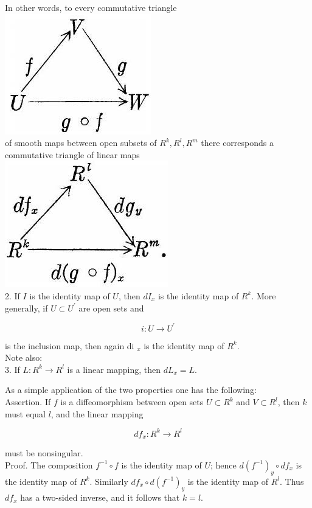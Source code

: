 \documentclass[10pt, letterpaper]{article}
\begin{document}
In other words, to every commutative triangle\\
\includegraphics[scale=0.2, center]{2025_05_28_7c9927389b272ddbc2c3g-14(1)}\\
of smooth maps between open subsets of $R^{k}, R^{l}, R^{m}$ there corresponds a commutative triangle of linear maps\\
\includegraphics[scale=0.2, center]{2025_05_28_7c9927389b272ddbc2c3g-14}\\
2. If $I$ is the identity map of $U$, then $d I_{x}$ is the identity map of $R^{k}$. More generally, if $U \subset U^{\prime}$ are open sets and

$$
i: U \rightarrow U^{\prime}
$$

is the inclusion map, then again di ${ }_{x}$ is the identity map of $R^{k}$.\\
Note also:\\
3. If $L: R^{k} \rightarrow R^{l}$ is a linear mapping, then $d L_{x}=L$.

As a simple application of the two properties one has the following:\\
Assertion. If $f$ is a diffeomorphism between open sets $U \subset R^{k}$ and $V \subset R^{l}$, then $k$ must equal $l$, and the linear mapping

$$
d f_{x}: R^{k} \rightarrow R^{l}
$$

must be nonsingular.\\
Proof. The composition $f^{-1} \circ f$ is the identity map of $U$; hence $d\left(f^{-1}\right)_{y} \circ d f_{x}$ is the identity map of $R^{k}$. Similarly $d f_{x} \circ d\left(f^{-1}\right)_{y}$ is the identity map of $R^{l}$. Thus $d f_{x}$ has a two-sided inverse, and it follows that $k=l$.
\end{document}
